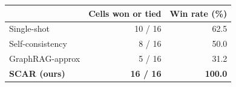 \begin{tabular}{lrr}
\toprule
 & Cells won or tied & Win rate (\%) \\
\midrule
Single-shot & 10 / 16 & 62.5 \\
Self-consistency & 8 / 16 & 50.0 \\
GraphRAG-approx & 5 / 16 & 31.2 \\
\textbf{SCAR (ours)} & \textbf{16 / 16} & \textbf{100.0} \\
\bottomrule
\end{tabular}